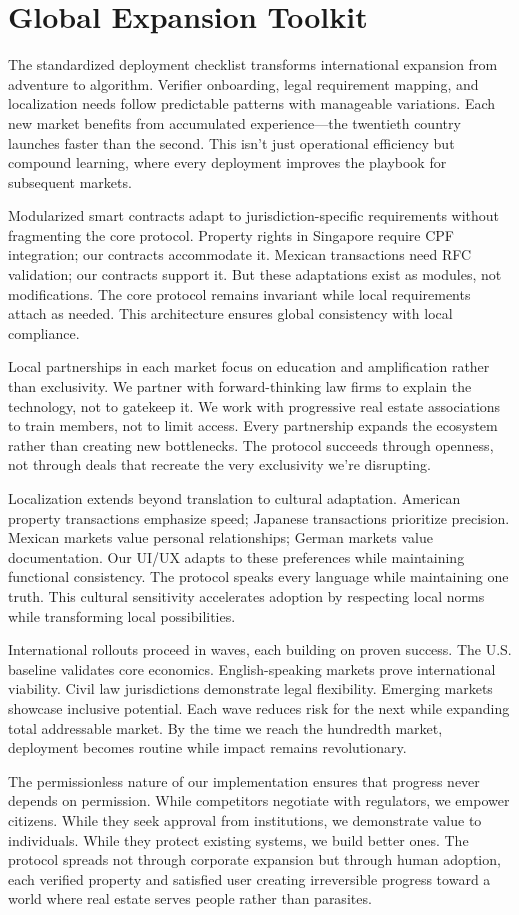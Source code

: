 \section{Global Expansion Toolkit}

The standardized deployment checklist transforms international expansion from adventure to algorithm. Verifier onboarding, legal requirement mapping, and localization needs follow predictable patterns with manageable variations. Each new market benefits from accumulated experience—the twentieth country launches faster than the second. This isn't just operational efficiency but compound learning, where every deployment improves the playbook for subsequent markets.

Modularized smart contracts adapt to jurisdiction-specific requirements without fragmenting the core protocol. Property rights in Singapore require CPF integration; our contracts accommodate it. Mexican transactions need RFC validation; our contracts support it. But these adaptations exist as modules, not modifications. The core protocol remains invariant while local requirements attach as needed. This architecture ensures global consistency with local compliance.

Local partnerships in each market focus on education and amplification rather than exclusivity. We partner with forward-thinking law firms to explain the technology, not to gatekeep it. We work with progressive real estate associations to train members, not to limit access. Every partnership expands the ecosystem rather than creating new bottlenecks. The protocol succeeds through openness, not through deals that recreate the very exclusivity we're disrupting.

Localization extends beyond translation to cultural adaptation. American property transactions emphasize speed; Japanese transactions prioritize precision. Mexican markets value personal relationships; German markets value documentation. Our UI/UX adapts to these preferences while maintaining functional consistency. The protocol speaks every language while maintaining one truth. This cultural sensitivity accelerates adoption by respecting local norms while transforming local possibilities.

International rollouts proceed in waves, each building on proven success. The U.S. baseline validates core economics. English-speaking markets prove international viability. Civil law jurisdictions demonstrate legal flexibility. Emerging markets showcase inclusive potential. Each wave reduces risk for the next while expanding total addressable market. By the time we reach the hundredth market, deployment becomes routine while impact remains revolutionary.

The permissionless nature of our implementation ensures that progress never depends on permission. While competitors negotiate with regulators, we empower citizens. While they seek approval from institutions, we demonstrate value to individuals. While they protect existing systems, we build better ones. The protocol spreads not through corporate expansion but through human adoption, each verified property and satisfied user creating irreversible progress toward a world where real estate serves people rather than parasites.